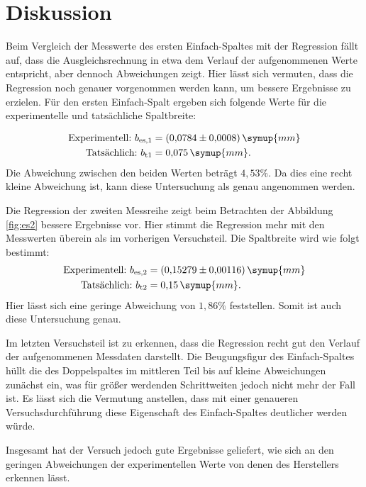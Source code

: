 \section{Diskussion}

Beim Vergleich der Messwerte des ersten Einfach-Spaltes mit der Regression fällt auf, dass die Ausgleichsrechnung in etwa dem Verlauf der aufgenommenen Werte entspricht, aber dennoch Abweichungen zeigt.
Hier lässt sich vermuten, dass die Regression noch genauer vorgenommen werden kann, um bessere Ergebnisse zu erzielen.
Für den ersten Einfach-Spalt ergeben sich folgende Werte für die experimentelle und tatsächliche Spaltbreite:

\begin{equation*}
\begin{aligned}
\text{Experimentell:}\,\, b_{\text{es,1}} &= (0{,}0784\pm 0{,}0008)\,\symup{mm} \\
\text{Tatsächlich:}\,\, b_{\text{t1}} &= 0{,}075\,\symup{mm}.\\
\end{aligned}
\end{equation*}
Die Abweichung zwischen den beiden Werten beträgt $4{,}53\%$. Da dies eine recht kleine  Abweichung ist, kann diese Untersuchung als genau angenommen werden.

Die Regression der zweiten Messreihe zeigt beim Betrachten der Abbildung \ref{fig:es2} bessere Ergebnisse vor. Hier stimmt die Regression mehr mit den Messwerten überein als im vorherigen Versuchsteil.
Die Spaltbreite wird wie folgt bestimmt:
\begin{equation*}
\begin{aligned}
\text{Experimentell:}\,\, b_{\text{es,2}} &= (0{,}15279\pm 0{,}00116)\,\symup{mm} \\
\text{Tatsächlich:}\,\, b_{\text{t2}} &= 0{,}15\,\symup{mm}.\\
\end{aligned}
\end{equation*}
Hier lässt sich eine geringe Abweichung von $1{,}86\%$ feststellen. Somit ist auch diese Untersuchung genau.

Im letzten Versuchsteil ist zu erkennen, dass die Regression recht gut den Verlauf der aufgenommenen Messdaten darstellt. Die Beugungsfigur des Einfach-Spaltes hüllt die des Doppelspaltes im mittleren Teil bis auf kleine Abweichungen zunächst
ein, was für größer werdenden Schrittweiten jedoch nicht mehr der Fall ist. Es lässt sich die Vermutung anstellen, dass mit einer genaueren Versuchsdurchführung diese Eigenschaft des Einfach-Spaltes deutlicher werden würde.

Insgesamt hat der Versuch jedoch gute Ergebnisse geliefert, wie sich an den geringen Abweichungen der experimentellen Werte von denen des Herstellers erkennen lässt.
